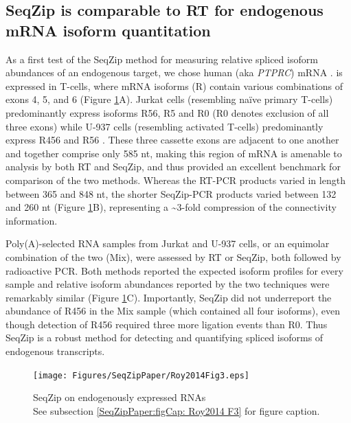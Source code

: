 	\subsection{SeqZip is comparable to RT for endogenous mRNA isoform quantitation}\label{SeqZipPaper:subsec: SeqZip comparable to RT}

		As a first test of the SeqZip method for measuring relative spliced isoform abundances of an endogenous target, we chose human \cd{} (aka \textit{PTPRC}) mRNA \citep{Zikherman2008}. \cd{} is expressed in T-cells, where mRNA isoforms (R) contain various combinations of exons 4, 5, and 6 (Figure \ref{SeqZipPaper:fig:Roy2014 F3}A). Jurkat cells (resembling naïve primary T-cells) predominantly express isoforms R56, R5 and R0 (R0 denotes exclusion of all three exons) while U-937 cells (resembling activated T-cells) predominantly express R456 and R56 \citep{Yeakley2002}. These three cassette exons are adjacent to one another and together comprise only 585 nt, making this region of \cd{} mRNA is amenable to analysis by both RT and SeqZip, and thus provided an excellent benchmark for comparison of the two methods. Whereas the RT-PCR products varied in length between 365 and 848 nt, the shorter SeqZip-PCR products varied between 132 and 260 nt (Figure \ref{SeqZipPaper:fig:Roy2014 F3}B), representing a \textasciitilde 3-fold compression of the connectivity information.

		Poly(A)-selected RNA samples from Jurkat and U-937 cells, or an equimolar combination of the two (Mix), were assessed by RT or SeqZip, both followed by radioactive PCR. Both methods reported the expected isoform profiles for every sample and relative isoform abundances reported by the two techniques were remarkably similar (Figure \ref{SeqZipPaper:fig:Roy2014 F3}C). Importantly, SeqZip did not underreport the abundance of R456 in the Mix sample (which contained all four isoforms), even though detection of R456 required three more ligation events than R0. Thus SeqZip is a robust method for detecting and quantifying spliced isoforms of endogenous transcripts. 

		\begin{figure} %
			\centering 
			\texttt{[image: Figures/SeqZipPaper/Roy2014Fig3.eps]}
			\caption[SeqZip on endogenously expressed RNAs]
			{
				SeqZip on endogenously expressed RNAs\\[0.25cm]
				See subsection \ref{SeqZipPaper:figCap: Roy2014 F3} for figure caption.
				}
			\label{SeqZipPaper:fig:Roy2014 F3}
			\end{figure}

